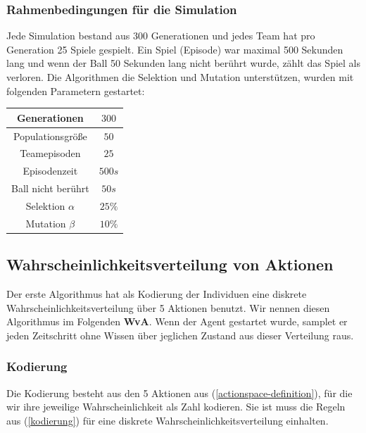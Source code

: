         \subsubsection*{Rahmenbedingungen für die Simulation}
        Jede Simulation bestand aus 300 Generationen und jedes Team hat pro Generation 25 Spiele gespielt. Ein Spiel (Episode) war maximal 500 Sekunden lang und wenn der Ball 50 Sekunden lang nicht berührt wurde, zählt das Spiel als verloren. Die Algorithmen die Selektion und Mutation unterstützen, wurden mit folgenden Parametern gestartet:
        \hfill \\
        \begin{center}
            \begin{tabular}{ |c|c| } 
                \hline
                Generationen       & $300$  \\ \hline
                Populationsgröße   & $50$   \\ \hline
                Teamepisoden       & $25$   \\ \hline
                Episodenzeit       & $500s$ \\ \hline
                Ball nicht berührt & $50s$  \\ \hline
                Selektion $\alpha$ & $25\%$ \\ \hline
                Mutation $\beta$   & $10\%$ \\ \hline
            \end{tabular}
        \end{center}

\newpage

        \subsection{Wahrscheinlichkeitsverteilung von Aktionen}

            Der erste Algorithmus hat als Kodierung der Individuen eine diskrete Wahrscheinlichkeitsverteilung über 5 Aktionen benutzt. Wir nennen diesen Algorithmus im Folgenden \textbf{WvA}. Wenn der Agent gestartet wurde, samplet er jeden Zeitschritt ohne Wissen über jeglichen Zustand aus dieser Verteilung raus. 

            \subsubsection*{Kodierung}
            Die Kodierung besteht aus den 5 Aktionen aus (\ref{actionspace-definition}), für die wir ihre jeweilige Wahrscheinlichkeit als Zahl kodieren. Sie ist muss die Regeln aus (\ref{kodierung}) für eine diskrete Wahrscheinlichkeitsverteilung einhalten.

